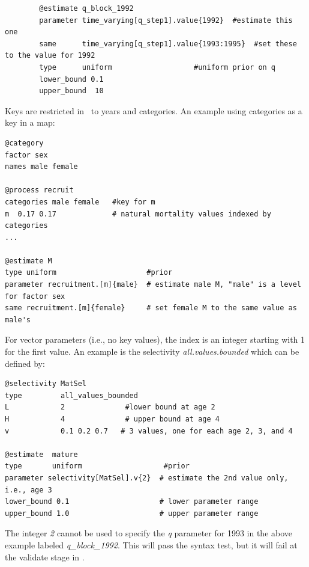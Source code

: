 {\small{\begin{verbatim}
		@estimate q_block_1992
		parameter time_varying[q_step1].value{1992}  #estimate this one
		same      time_varying[q_step1].value{1993:1995}  #set these to the value for 1992
		type      uniform                   #uniform prior on q
		lower_bound 0.1 
		upper_bound  10  
\end{verbatim}}}

Keys are restricted in \CNAME\ to years and categories. An example using categories as a key in a map:

{\small{\begin{verbatim}
@category
factor sex
names male female

@process recruit
categories male female   #key for m
m  0.17 0.17             # natural mortality values indexed by categories
...

@estimate M
type uniform                     #prior
parameter recruitment.[m]{male}  # estimate male M, "male" is a level for factor sex
same recruitment.[m]{female}     # set female M to the same value as male's
\end{verbatim}}}
	
For vector parameters (i.e., no key values), the index is an integer starting with 1 for the first value. An example is the selectivity \textit{all.values.bounded} which can be defined by:

{\small{\begin{verbatim}
@selectivity MatSel
type         all_values_bounded
L            2              #lower bound at age 2
H            4              # upper bound at age 4
v            0.1 0.2 0.7   # 3 values, one for each age 2, 3, and 4

@estimate  mature
type       uniform                   #prior
parameter selectivity[MatSel].v{2}  # estimate the 2nd value only, i.e., age 3
lower_bound 0.1                     # lower parameter range
upper_bound 1.0                     # upper parameter range
\end{verbatim}}}
	
The integer \textit{{2}} cannot be used to specify the \textit{q} parameter for 1993 in the above example labeled \textit{q\_block\_1992}. This will pass the syntax test, but it will fail at the validate stage in \CNAME.


\paragraph*{\label{sec:declare}}

